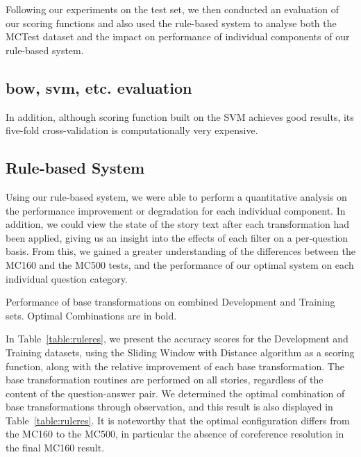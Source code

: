 \documentclass[11pt]{article}
\begin{document}
Following our experiments on the test set, we then conducted an evaluation of our scoring functions and also used the rule-based system to analyse both the MCTest dataset and the impact on performance of individual components of our rule-based system.

\subsection{bow, svm, etc. evaluation}

In addition, although  scoring function built on the SVM achieves good %
results, its five-fold cross-validation is computationally very expensive.

\subsection{Rule-based System}

Using our rule-based system, we were able to perform a quantitative analysis on the performance improvement or degradation for each individual component. In addition, we could view the state of the story text after each transformation had been applied, giving us an insight into the effects of each filter on a per-question basis. From this, we gained a greater understanding of the differences between the MC160 and the MC500 tests, and the performance of our optimal system on each individual question category.

\begin{table}[!th]

\caption{Performance of base transformations on combined Development and Training sets. Optimal Combinations are in bold.}
\label{table:ruleres}
\end{table}

In Table~\ref{table:ruleres}, we present the accuracy scores for the Development and Training datasets, using the Sliding Window with Distance algorithm as a scoring function, along with the relative improvement of each base transformation. The base transformation routines are performed on all stories, regardless of the content of the question-answer pair. We determined the optimal combination of base transformations through observation, and this result is also displayed in Table~\ref{table:ruleres}. It is noteworthy that the optimal configuration differs from the MC160 to the MC500, in particular the absence of coreference resolution in the final MC160 result.
\end{document}
